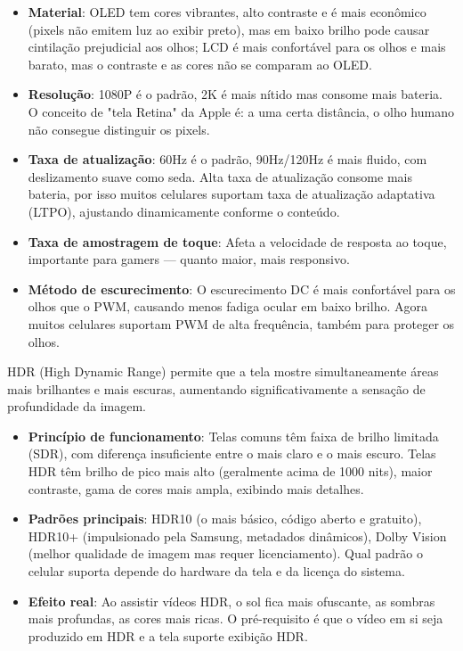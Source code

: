 \begin{itemize}
  \item \textbf{Material}: OLED tem cores vibrantes, alto contraste e é mais econômico (pixels não emitem luz ao exibir preto), mas em baixo brilho pode causar cintilação prejudicial aos olhos; LCD é mais confortável para os olhos e mais barato, mas o contraste e as cores não se comparam ao OLED.
  \item \textbf{Resolução}: 1080P é o padrão, 2K é mais nítido mas consome mais bateria. O conceito de "tela Retina" da Apple é: a uma certa distância, o olho humano não consegue distinguir os pixels.
  \item \textbf{Taxa de atualização}: 60Hz é o padrão, 90Hz/120Hz é mais fluido, com deslizamento suave como seda. Alta taxa de atualização consome mais bateria, por isso muitos celulares suportam taxa de atualização adaptativa (LTPO), ajustando dinamicamente conforme o conteúdo.
  \item \textbf{Taxa de amostragem de toque}: Afeta a velocidade de resposta ao toque, importante para gamers — quanto maior, mais responsivo.
  \item \textbf{Método de escurecimento}: O escurecimento DC é mais confortável para os olhos que o PWM, causando menos fadiga ocular em baixo brilho. Agora muitos celulares suportam PWM de alta frequência, também para proteger os olhos.
\end{itemize}


HDR (High Dynamic Range) permite que a tela mostre simultaneamente áreas mais brilhantes e mais escuras, aumentando significativamente a sensação de profundidade da imagem.

\begin{itemize}
  \item \textbf{Princípio de funcionamento}: Telas comuns têm faixa de brilho limitada (SDR), com diferença insuficiente entre o mais claro e o mais escuro. Telas HDR têm brilho de pico mais alto (geralmente acima de 1000 nits), maior contraste, gama de cores mais ampla, exibindo mais detalhes.
  \item \textbf{Padrões principais}: HDR10 (o mais básico, código aberto e gratuito), HDR10+ (impulsionado pela Samsung, metadados dinâmicos), Dolby Vision (melhor qualidade de imagem mas requer licenciamento). Qual padrão o celular suporta depende do hardware da tela e da licença do sistema.
  \item \textbf{Efeito real}: Ao assistir vídeos HDR, o sol fica mais ofuscante, as sombras mais profundas, as cores mais ricas. O pré-requisito é que o vídeo em si seja produzido em HDR e a tela suporte exibição HDR.
\end{itemize}

